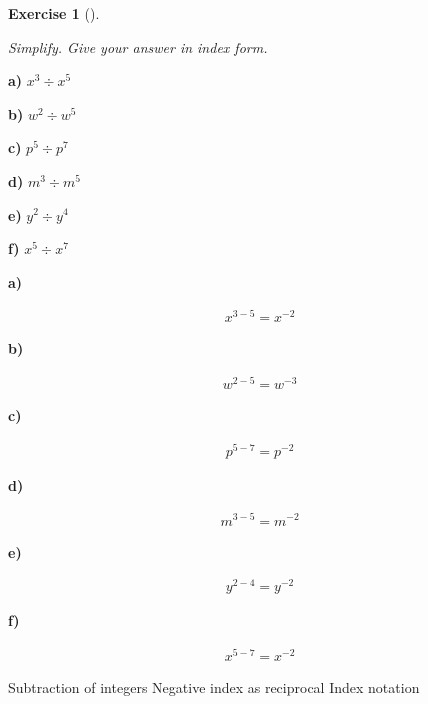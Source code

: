 \documentclass[
  letterpaper,
  DIV=11,
  numbers=noendperiod]{scrreprt}
\theoremstyle{definition}
\newtheorem{exercise}{Exercise}[chapter]
\theoremstyle{remark}
\begin{document}
\begin{exercise}[]\protect\hypertarget{exr-u2-16}{}\label{exr-u2-16}

\emph{Simplify. Give your answer in index form.}

\textbf{a)} \(\displaystyle x^{3} \div x^{5}\)

\textbf{b)} \(\displaystyle w^{2} \div w^{5}\)

\textbf{c)} \(\displaystyle p^{5} \div p^{7}\)

\textbf{d)} \(\displaystyle m^{3} \div m^{5}\)

\textbf{e)} \(\displaystyle y^{2} \div y^{4}\)

\textbf{f)} \(\displaystyle x^{5} \div x^{7}\)

\begin{tcolorbox}[enhanced jigsaw, opacitybacktitle=0.6, coltitle=black, arc=.35mm, colframe=quarto-callout-tip-color-frame, colback=white, bottomrule=.15mm, left=2mm, colbacktitle=quarto-callout-tip-color!10!white, titlerule=0mm, opacityback=0, title=\textcolor{quarto-callout-tip-color}{\faLightbulb}\hspace{0.5em}{🔍 View Solutions}, leftrule=.75mm, breakable, rightrule=.15mm, bottomtitle=1mm, toptitle=1mm, toprule=.15mm]

\textbf{a)}

\[
\begin{aligned}
x^{3-5} = x^{-2}
\end{aligned}
\]

\textbf{b)}

\[
\begin{aligned}
w^{2-5} = w^{-3}
\end{aligned}
\]

\textbf{c)}

\[
\begin{aligned}
p^{5-7} = p^{-2}
\end{aligned}
\]

\textbf{d)}

\[
\begin{aligned}
m^{3-5} = m^{-2}
\end{aligned}
\]

\textbf{e)}

\[
\begin{aligned}
y^{2-4} = y^{-2}
\end{aligned}
\]

\textbf{f)}

\[
\begin{aligned}
x^{5-7} = x^{-2}
\end{aligned}
\]

\end{tcolorbox}

{Subtraction of integers} {Negative index as reciprocal} {Index
notation}

\end{exercise}
\end{document}
